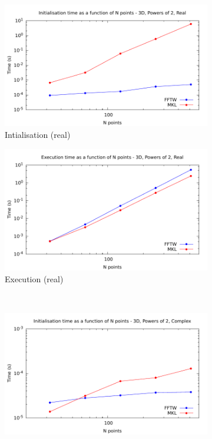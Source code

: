\documentclass[12pt, a4paper]{article}
\begin{document}
\begin{figure}[H]
\captionsetup{width=0.8\linewidth}
\centering
\begin{subfigure}{.5\textwidth}
\centering
\includegraphics[width=.9\linewidth]{graphs/3d-pow2-init-r.pdf}
\caption{Intialisation (real)}
\label{3DPOW2RI}
\end{subfigure}%
\begin{subfigure}{.5\textwidth}
\centering
\includegraphics[width=.9\linewidth]{graphs/3d-pow2-exec-r.pdf}
\caption{Execution (real)}
\label{3DPOW2R}
\end{subfigure}\\
\begin{subfigure}{.5\textwidth}
\centering
\includegraphics[width=.9\linewidth]{graphs/3d-pow2-init-c.pdf}

\end{subfigure}
\end{figure}
\end{document}
